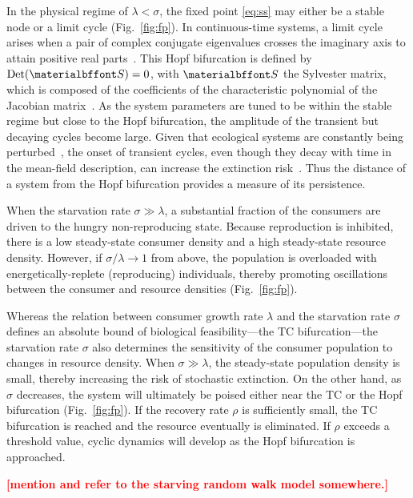 \documentclass{pnastwo}
\newcommand{\sid}[1]{\textcolor{red}{\bf [#1]}}
\begin{document}
\begin{article}
In the physical regime of $\lambda<\sigma$, the fixed point \eqref{eq:ss} may
either be a stable node or a limit cycle (Fig.~\ref{fig:fp}).  In
continuous-time systems, a limit cycle arises when a pair of complex
conjugate eigenvalues crosses the imaginary axis to attain positive real
parts~\cite{GuckHolmes}.  This Hopf bifurcation is defined by
${\rm Det}({\bf S}) = 0$, with $\bf S$ the Sylvester matrix, which is
composed of the coefficients of the characteristic polynomial of the Jacobian
matrix~\cite{Gross:2004p2428}.  As the system parameters are tuned to be
within the stable regime but close to the Hopf bifurcation, the amplitude of
the transient but decaying cycles become large.  Given that ecological
systems are constantly being perturbed~\cite{Hastings:2001jh}, the onset of
transient cycles, even though they decay with time in the mean-field
description, can increase the extinction
risk~\cite{Neubert:1997wk,Caswell:2005eo,Neubert:2009td}.  Thus the distance
of a system from the Hopf bifurcation provides a measure of its persistence.

When the starvation rate $\sigma\gg\lambda$, a substantial fraction of the
consumers are driven to the hungry non-reproducing state.  Because
reproduction is inhibited, there is a low steady-state consumer density and a
high steady-state resource density.  However, if $\sigma/\lambda\to 1$ from
above, the population is overloaded with energetically-replete (reproducing)
individuals, thereby promoting oscillations between the consumer and resource
densities (Fig.~\ref{fig:fp}).

Whereas the relation between consumer growth rate $\lambda$ and the
starvation rate $\sigma$ defines an absolute bound of biological
feasibility---the TC bifurcation---the starvation rate $\sigma$ also
determines the sensitivity of the consumer population to changes in resource
density.  When $\sigma\gg\lambda$, the steady-state population density is
small, thereby increasing the risk of stochastic extinction.  On the other
hand, as $\sigma$ decreases, the system will ultimately be poised either near
the TC or the Hopf bifurcation (Fig.~\ref{fig:fp}).  If the recovery rate
$\rho$ is sufficiently small, the TC bifurcation is reached and the resource
eventually is eliminated.  If $\rho$ exceeds a threshold value, cyclic
dynamics will develop as the Hopf bifurcation is approached.

\sid{mention  and refer to the starving random walk model somewhere.}
\\


\end{article}
\end{document}

